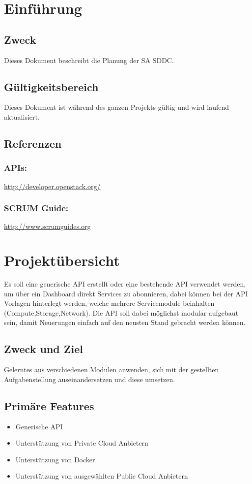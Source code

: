 \documentclass[11pt]{scrartcl}
\begin{document}
\newpage
\tableofcontents
\newpage

\section{Einführung}
\subsection{Zweck}
Dieses Dokument beschreibt die Planung der SA SDDC.
\subsection{Gültigkeitsbereich}
Dieses Dokument ist während des ganzen Projekts gültig und wird laufend aktualisiert.

\subsection{Referenzen}
\subsubsection{APIs:} \href{http://developer.openstack.org/}{http://developer.openstack.org/}
\subsubsection{SCRUM Guide:} \href{http://www.scrumguides.org/docs/scrumguide/v1/Scrum-Guide-DE.pdf}{http://www.scrumguides.org}
\section{Projektübersicht}
Es soll eine generische API erstellt oder eine bestehende API verwendet werden, um über ein 
Dashboard direkt Services zu abonnieren, dabei können bei der API Vorlagen 
hinterlegt werden, welche mehrere Servicemodule beinhalten 
(Compute,Storage,Network).
Die API soll dabei möglichst modular aufgebaut sein, damit Neuerungen einfach 
auf den neusten Stand gebracht werden können.
\subsection{Zweck und Ziel}
 Gelerntes aus verschiedenen Modulen anwenden, sich mit der gestellten Aufgabenstellung auseinandersetzen 
 und diese umsetzen.

\subsection{Primäre Features}
\begin{itemize}
  \item Generische API
  \item Unterstützung von Private Cloud Anbietern
  \item Unterstützung von Docker
  \item Unterstützung von ausgewählten Public Cloud Anbietern
\end{itemize}
\end{document}
